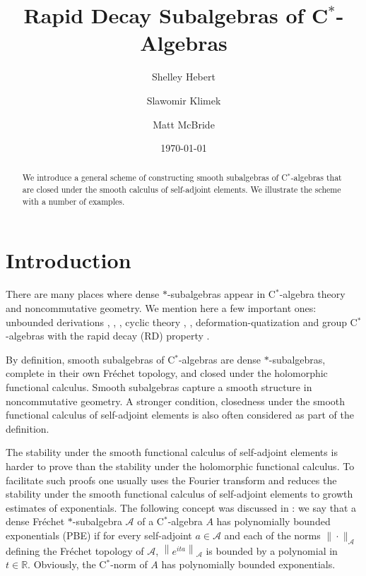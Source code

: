 \documentclass[12pt,reqno]{amsart}
\numberwithin{equation}{section}
\newcommand{\R}{{\mathbb R}}
\begin{document}
\title{Rapid Decay Subalgebras of C$^*$-Algebras}

\author[Hebert]{Shelley Hebert}
\address{Department of Mathematics,
East Mississippi Community College,
8731 S Frontage Rd. Mayhew, MS 39753, U.S.A.}

\author[Klimek]{Slawomir Klimek}
\address{Department of Mathematical Sciences,
Indiana University Indianapolis,
402 N. Blackford St., Indianapolis, IN 46202, U.S.A.}

\author[McBride]{Matt McBride}
\address{Department of Mathematics and Statistics,
Mississippi State University,
175 President's Cir., Mississippi State, MS 39762, U.S.A.}


\date{\today}

\begin{abstract}
We introduce a general scheme of constructing smooth subalgebras of C$^*$-algebras that are closed under the smooth calculus of self-adjoint elements. We illustrate the scheme with a number of examples.
\end{abstract}

\maketitle

\section{Introduction}


There are many places where dense $*$-subalgebras appear in C$^*$-algebra theory and noncommutative geometry. We mention here a few important ones: unbounded derivations \cite{BEJ}, \cite{Bo}, \cite{KMRSW}, cyclic theory \cite{Connes}, \cite{Ren}, deformation-quatization \cite {Rie} and group C$^*$-algebras with the rapid decay (RD) property \cite{Jo}.

By definition, smooth subalgebras of C$^*$-algebras are dense $*$-subalgebras, complete in their own  Fr\'echet topology, and closed under the holomorphic functional calculus. Smooth subalgebras capture a smooth structure in noncommutative geometry. A stronger condition, closedness under the smooth functional calculus of self-adjoint elements is also often considered as part of the definition.

The stability under the smooth functional calculus of self-adjoint elements is harder to prove than the stability under the holomorphic functional calculus. To facilitate such proofs one usually uses the Fourier transform and reduces the stability under the smooth functional calculus of self-adjoint elements to growth estimates of exponentials. The following concept was discussed in \cite{KM2}: we say that a dense Fr\'echet $*$-subalgebra $\mathcal{A}$ of a C$^*$-algebra $A$ has polynomially bounded exponentials (PBE) if for every self-adjoint $a\in\mathcal{A}$ and each of the norms $\|\cdot\|_{\mathcal{A}}$ defining the Fr\'echet topology of $\mathcal{A}$, $\left\| e^{ita}\right\|_{\mathcal{A}}$ is bounded by a polynomial in $t\in\R$. Obviously, the C$^*$-norm of $A$ has polynomially bounded exponentials.
\end{document}
